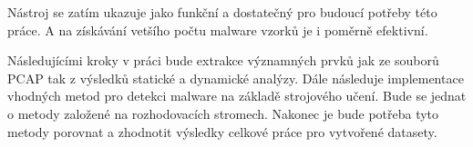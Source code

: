 Nástroj se zatím ukazuje jako funkční a dostatečný pro budoucí potřeby této práce. A na získávání vetšího počtu malware vzorků je i poměrně efektivní.

Následujícími kroky v práci bude extrakce významných prvků jak ze souborů PCAP tak z výsledků statické a dynamické analýzy.
Dále následuje implementace vhodných metod pro detekci malware na základě strojového učení. Bude se jednat o metody založené na rozhodovacích stromech.
Nakonec je bude potřeba tyto metody porovnat a zhodnotit výsledky celkové práce pro vytvořené datasety.



%
